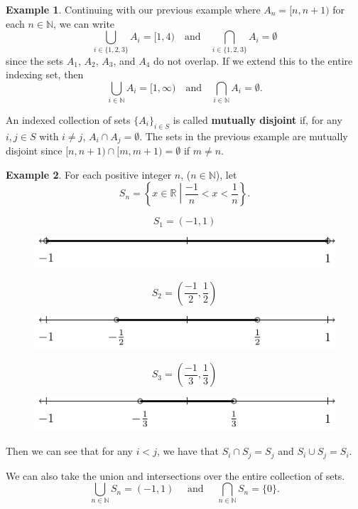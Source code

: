 \documentclass[
]{book}
\theoremstyle{definition}
\theoremstyle{definition}
\newtheorem{example}{Example}[chapter]
\theoremstyle{definition}
\theoremstyle{definition}
\theoremstyle{remark}
\begin{document}
\begin{example}
\protect\hypertarget{exm:disjoint}{}\label{exm:disjoint}Continuing with our previous example where \(A_n= [n,n+1)\) for each \(n\in \mathbb{N}\), we can write
\[\bigcup_{i\in \{1,2,3\}} A_i = [1,4) \quad \mbox{and} \quad \bigcap_{i\in \{1,2,3\}} A_i = \emptyset\]
since the sets \(A_1\), \(A_2\), \(A_3\), and \(A_4\) do not overlap. If we extend this to the entire indexing set, then \[\bigcup_{i\in \mathbb{N}} A_i = [1,\infty) \quad \mbox{and} \quad \bigcap_{i\in \mathbb{N}} A_i = \emptyset.\]
\end{example}

An indexed collection of sets \(\{A_i\}_{i\in S}\) is called \textbf{mutually disjoint} if, for any \(i,j\in S\) with \(i\neq j\), \(A_i \cap A_j = \emptyset\). The sets in the previous example are mutually disjoint since \([n,n+1) \cap [m,m+1) = \emptyset\) if \(m\neq n\).

\begin{example}
For each positive integer \(n\), (\(n\in \mathbb{N}\)), let \[S_n= \left\{x\in \mathbb{R}\middle \vert \frac{-1}{n} < x < \frac{1}{n} \right\}.\]

\[S_1=(-1,1)\]

\begin{figure}

{\centering \includegraphics[width=0.35\linewidth]{tikz/Nested_s1} 

}

\end{figure}

\[S_2=(\frac{-1}{2}, \frac{1}{2})\]

\begin{figure}

{\centering \includegraphics[width=0.35\linewidth]{tikz/Nested_s2} 

}

\end{figure}

\[S_3=(\frac{-1}{3}, \frac{1}{3})\]

\begin{figure}

{\centering \includegraphics[width=0.35\linewidth]{tikz/Nested_s3} 

}

\end{figure}

Then we can see that for any \(i<j\), we have that \(S_i\cap S_j = S_j\) and \(S_i \cup S_j = S_i\).

We can also take the union and intersections over the entire collection of sets.
\[\bigcup_{n\in \mathbb{N}} S_n = (-1,1) \quad \mbox{ and } \quad \bigcap_{n\in \mathbb{N}} S_n = \{0\}.\]
\end{example}
\end{document}
